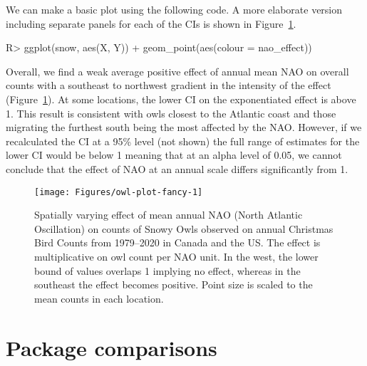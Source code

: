 \documentclass[article]{jss}\usepackage[]{graphicx}\usepackage[dvipsnames]{xcolor}
\begin{document}
We can make a basic plot using the following code. A more elaborate version including separate panels for each of the CIs is shown in Figure~\ref{fig:owl-plot-fancy}.

\begin{Schunk}
\begin{Sinput}
R> ggplot(snow, aes(X, Y)) + geom_point(aes(colour = nao_effect))
\end{Sinput}
\end{Schunk}

Overall, we find a weak average positive effect of annual mean NAO on overall counts with a southeast to northwest gradient in the intensity of the effect (Figure~\ref{fig:owl-plot-fancy}).
At some locations, the lower CI on the exponentiated effect is above 1.
This result is consistent with owls closest to the Atlantic coast and those migrating the furthest south being the most affected by the NAO.
However, if we recalculated the CI at a 95\% level (not shown) the full range of estimates for the lower CI would be below 1 meaning that at an alpha level of 0.05, we cannot conclude that the effect of NAO at an annual scale differs significantly from 1.







\begin{Schunk}
\begin{figure}[htbp]

{\centering \texttt{[image: Figures/owl-plot-fancy-1]}

}

\caption[Spatially varying effect of mean annual NAO (North Atlantic Oscillation) on counts of Snowy Owls observed on annual Christmas Bird Counts from 1979--2020 in Canada and the US]{Spatially varying effect of mean annual NAO (North Atlantic Oscillation) on counts of Snowy Owls observed on annual Christmas Bird Counts from 1979--2020 in Canada and the US. The effect is multiplicative on owl count per NAO unit. In the west, the lower bound of values overlaps 1 implying no effect, whereas in the southeast the effect becomes positive. Point size is scaled to the mean counts in each location.}\label{fig:owl-plot-fancy}
\end{figure}
\end{Schunk}

\newpage

\section{Package comparisons}\label{package-comparisons}
\end{document}
